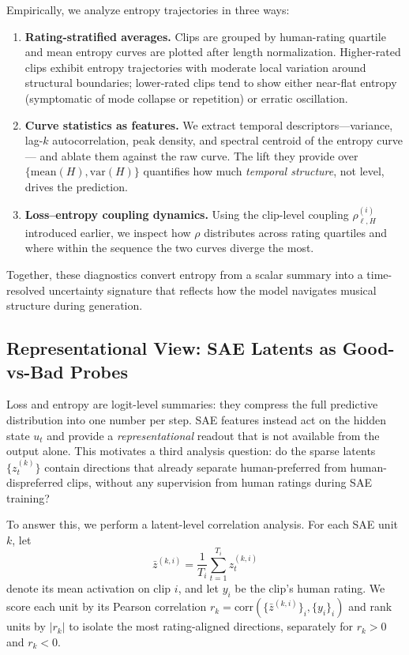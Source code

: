 \documentclass{article}
\begin{document}
Empirically, we analyze entropy trajectories in three ways:
\begin{enumerate}
  \item \textbf{Rating-stratified averages.}
    Clips are grouped by human-rating quartile
    and mean entropy curves are plotted after length normalization.
    Higher-rated clips exhibit entropy trajectories with moderate local variation
    around structural boundaries;
    lower-rated clips tend to show either near-flat entropy
    (symptomatic of mode collapse or repetition)
    or erratic oscillation.
  \item \textbf{Curve statistics as features.}
    We extract temporal descriptors---variance, lag-$k$ autocorrelation,
    peak density, and spectral centroid of the entropy curve---%
    and ablate them against the raw curve.
    The lift they provide over $\{\mathrm{mean}(H),\mathrm{var}(H)\}$
    quantifies how much \emph{temporal structure}, not level, drives the prediction.
  \item \textbf{Loss--entropy coupling dynamics.}
    Using the clip-level coupling $\rho_{\ell,H}^{(i)}$ introduced earlier,
    we inspect how $\rho$ distributes across rating quartiles
    and where within the sequence the two curves diverge the most.
\end{enumerate}
Together, these diagnostics convert entropy from a scalar summary
into a time-resolved uncertainty signature
that reflects how the model navigates musical structure during generation.

\subsection{Representational View: SAE Latents as Good-vs-Bad Probes}
\label{subsec:sae}

Loss and entropy are logit-level summaries:
they compress the full predictive distribution into one number per step.
SAE features instead act on the hidden state $u_t$
and provide a \emph{representational} readout
that is not available from the output alone.
This motivates a third analysis question:
do the sparse latents $\{z_t^{(k)}\}$ contain directions
that already separate human-preferred from human-dispreferred clips,
without any supervision from human ratings during SAE training?

To answer this, we perform a latent-level correlation analysis.
For each SAE unit $k$, let
\begin{equation}
  \bar{z}^{(k,i)}=\frac{1}{T_i}\sum_{t=1}^{T_i} z_t^{(k,i)}
\end{equation}
denote its mean activation on clip $i$, and let $y_i$ be the clip's human rating.
We score each unit by its Pearson correlation
$r_k=\mathrm{corr}(\{\bar{z}^{(k,i)}\}_i,\{y_i\}_i)$
and rank units by $|r_k|$
to isolate the most rating-aligned directions,
separately for $r_k>0$ and $r_k<0$.
\end{document}
